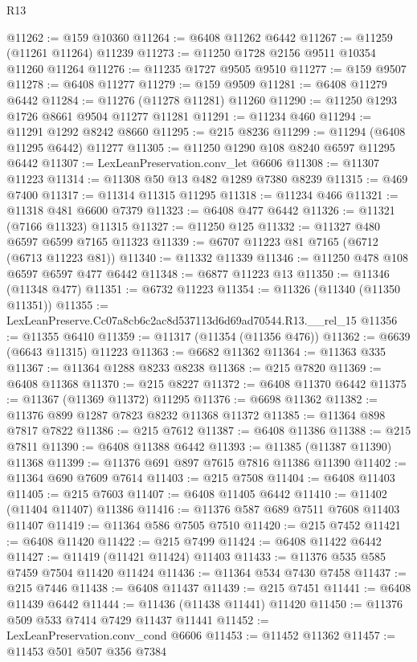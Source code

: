 \begin{lexlean}{R13}
\begin{coremodule}
@11262 := @159 @10360
@11264 := @6408 @11262 @6442
@11267 := @11259 (@11261 @11264) @11239
@11273 := @11250 @1728 @2156 @9511 @10354 @11260 @11264
@11276 := @11235 @1727 @9505 @9510
@11277 := @159 @9507
@11278 := @6408 @11277
@11279 := @159 @9509
@11281 := @6408 @11279 @6442
@11284 := @11276 (@11278 @11281) @11260
@11290 := @11250 @1293 @1726 @8661 @9504 @11277 @11281
@11291 := @11234 @460
@11294 := @11291 @1292 @8242 @8660
@11295 := @215 @8236
@11299 := @11294 (@6408 @11295 @6442) @11277
@11305 := @11250 @1290 @108 @8240 @6597 @11295 @6442
@11307 := LexLeanPreservation.conv_let @6606
@11308 := @11307 @11223
@11314 := @11308 @50 @13 @482 @1289 @7380 @8239
@11315 := @469 @7400
@11317 := @11314 @11315 @11295
@11318 := @11234 @466
@11321 := @11318 @481 @6600 @7379
@11323 := @6408 @477 @6442
@11326 := @11321 (@7166 @11323) @11315
@11327 := @11250 @125
@11332 := @11327 @480 @6597 @6599 @7165 @11323
@11339 := @6707 @11223 @81 @7165 (@6712 (@6713 @11223 @81))
@11340 := @11332 @11339
@11346 := @11250 @478 @108 @6597 @6597 @477 @6442
@11348 := @6877 @11223 @13
@11350 := @11346 (@11348 @477)
@11351 := @6732 @11223
@11354 := @11326 (@11340 (@11350 @11351))
@11355 := LexLeanPreserve.Cc07a8cb6c2ac8d537113d6d69ad70544.R13.__rel_15
@11356 := @11355 @6410
@11359 := @11317 (@11354 (@11356 @476))
@11362 := @6639 (@6643 @11315) @11223
@11363 := @6682 @11362
@11364 := @11363 @335
@11367 := @11364 @1288 @8233 @8238
@11368 := @215 @7820
@11369 := @6408 @11368
@11370 := @215 @8227
@11372 := @6408 @11370 @6442
@11375 := @11367 (@11369 @11372) @11295
@11376 := @6698 @11362
@11382 := @11376 @899 @1287 @7823 @8232 @11368 @11372
@11385 := @11364 @898 @7817 @7822
@11386 := @215 @7612
@11387 := @6408 @11386
@11388 := @215 @7811
@11390 := @6408 @11388 @6442
@11393 := @11385 (@11387 @11390) @11368
@11399 := @11376 @691 @897 @7615 @7816 @11386 @11390
@11402 := @11364 @690 @7609 @7614
@11403 := @215 @7508
@11404 := @6408 @11403
@11405 := @215 @7603
@11407 := @6408 @11405 @6442
@11410 := @11402 (@11404 @11407) @11386
@11416 := @11376 @587 @689 @7511 @7608 @11403 @11407
@11419 := @11364 @586 @7505 @7510
@11420 := @215 @7452
@11421 := @6408 @11420
@11422 := @215 @7499
@11424 := @6408 @11422 @6442
@11427 := @11419 (@11421 @11424) @11403
@11433 := @11376 @535 @585 @7459 @7504 @11420 @11424
@11436 := @11364 @534 @7430 @7458
@11437 := @215 @7446
@11438 := @6408 @11437
@11439 := @215 @7451
@11441 := @6408 @11439 @6442
@11444 := @11436 (@11438 @11441) @11420
@11450 := @11376 @509 @533 @7414 @7429 @11437 @11441
@11452 := LexLeanPreservation.conv_cond @6606
@11453 := @11452 @11362
@11457 := @11453 @501 @507 @356 @7384

\end{coremodule}
\end{lexlean}
